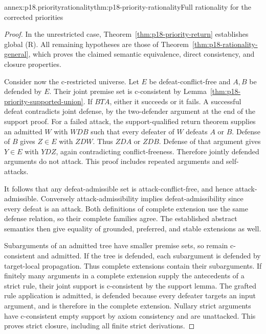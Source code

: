 \begin{annexitem}{annex:p18.priorityrationality}{thm:p18-priority-rationality}{Full rationality for the corrected priorities}
\begin{proof}
In the unrestricted case, Theorem~\ref{thm:p18-priority-return}
establishes global (R). All remaining hypotheses are those of
Theorem~\ref{thm:p18-rationality-general}, which proves the claimed
semantic equivalence, direct consistency, and closure properties.

Consider now the c-restricted universe. Let \(E\) be defeat-conflict-free
and \(A,B\) be defended by \(E\).
Their joint premise set is c-consistent by
Lemma~\ref{thm:p18-priority-supported-union}.
If \(B T A\), either it succeeds or it fails.
A successful defeat contradicts joint defense, by the two-defender
argument at the end of the support proof.
For a failed attack, the support-qualified return theorem supplies
an admitted \(W\) with \(W D B\) such that every defeater of \(W\)
defeats \(A\) or \(B\).
Defense of \(B\) gives \(Z\in E\) with \(Z D W\).
Thus \(Z D A\) or \(Z D B\). Defense of that argument gives
\(Y\in E\) with \(Y D Z\), again contradicting conflict-freeness.
Therefore jointly defended arguments do not attack.
This proof includes repeated arguments and self-attacks.

It follows that any defeat-admissible set is attack-conflict-free,
and hence attack-admissible. Conversely attack-admissibility implies
defeat-admissibility since every defeat is an attack.
Both definitions of complete extension use the same defense relation,
so their complete families agree. The established abstract semantics
then give equality of grounded, preferred, and stable extensions as well.

Subarguments of an admitted tree have smaller premise sets, so remain
c-consistent and admitted. If the tree is defended, each subargument
is defended by target-local propagation. Thus complete extensions
contain their subarguments.
If finitely many arguments in a complete extension supply the antecedents
of a strict rule, their joint support is c-consistent by the support
lemma. The grafted rule application is admitted, is defended because
every defeater targets an input argument, and is therefore in the
complete extension. Nullary strict arguments have c-consistent empty
support by axiom consistency and are unattacked. This proves strict
closure, including all finite strict derivations.


\end{proof}
\end{annexitem}

